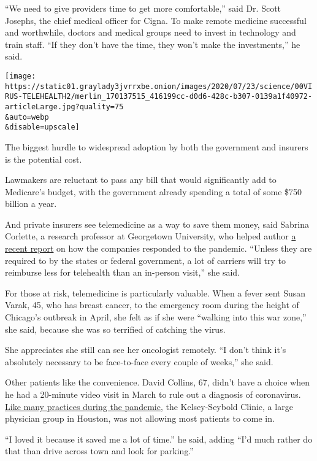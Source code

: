 ``We need to give providers time to get more comfortable,'' said Dr.
Scott Josephs, the chief medical officer for Cigna. To make remote
medicine successful and worthwhile, doctors and medical groups need to
invest in technology and train staff. ``If they don't have the time,
they won't make the investments,'' he said.

\texttt{[image: https://static01.graylady3jvrrxbe.onion/images/2020/07/23/science/00VIRUS-TELEHEALTH2/merlin\_170137515\_416199cc-d0d6-428c-b307-0139a1f40972-articleLarge.jpg?quality=75\\\&auto=webp\\\&disable=upscale]}

The biggest hurdle to widespread adoption by both the government and
insurers is the potential cost.

Lawmakers are reluctant to pass any bill that would significantly add to
Medicare's budget, with the government already spending a total of some
\$750 billion a year.

And private insurers see telemedicine as a way to save them money, said
Sabrina Corlette, a research professor at Georgetown University, who
helped author
\href{https://www.rwjf.org/en/library/research/2020/06/the-covid-19-pandemic-insurer-insights-into-challenges-implications-and-lessons-learned.html?cid=xem_other_unpd_ini:moni_dte:20200629_des:insurer\%20insight}{a
recent report} on how the companies responded to the pandemic. ``Unless
they are required to by the states or federal government, a lot of
carriers will try to reimburse less for telehealth than an in-person
visit,'' she said.

For those at risk, telemedicine is particularly valuable. When a fever
sent Susan Varak, 45, who has breast cancer, to the emergency room
during the height of Chicago's outbreak in April, she felt as if she
were ``walking into this war zone,'' she said, because she was so
terrified of catching the virus.

She appreciates she still can see her oncologist remotely. ``I don't
think it's absolutely necessary to be face-to-face every couple of
weeks,'' she said.

Other patients like the convenience. David Collins, 67, didn't have a
choice when he had a 20-minute video visit in March to rule out a
diagnosis of coronavirus.
\href{https://www.nytimes3xbfgragh.onion/2020/03/11/health/telemedicine-coronavirus.html}{Like
many practices during the pandemic}, the Kelsey-Seybold Clinic, a large
physician group in Houston, was not allowing most patients to come in.

``I loved it because it saved me a lot of time.'' he said, adding ``I'd
much rather do that than drive across town and look for parking.''

